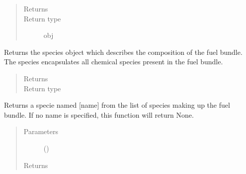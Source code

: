 \documentclass[letterpaper,10pt,openany,oneside,english]{sphinxmanual}
\begin{document}
\begin{fulllineitems}
\begin{fulllineitems}
\begin{quote}
\begin{description}
\item[{Returns}] \leavevmode
{}

\item[{Return type}] \leavevmode
obj

\end{description}\end{quote}

\end{fulllineitems}


\begin{fulllineitems}
\label{\detokenize{support_rst/fuel_segment:fuel_segment.FuelSegment.get_species}}
Returns the species object which describes the composition of the fuel
bundle. The species encapsulates all chemical species present in the
fuel bundle.
\begin{quote}\begin{description}
\item[{Returns}] \leavevmode
{}

\item[{Return type}] \leavevmode
{}

\end{description}\end{quote}

\end{fulllineitems}


\begin{fulllineitems}
\label{\detokenize{support_rst/fuel_segment:fuel_segment.FuelSegment.specie}}
Returns a specie named {[}name{]} from the list of species making up the
fuel bundle. If no name is specified, this function will return None.
\begin{quote}\begin{description}
\item[{Parameters}] \leavevmode
{} () \textendash{} 

\item[{Returns}] \leavevmode
{}


\end{description}
\end{quote}
\end{fulllineitems}
\end{fulllineitems}
\end{document}
